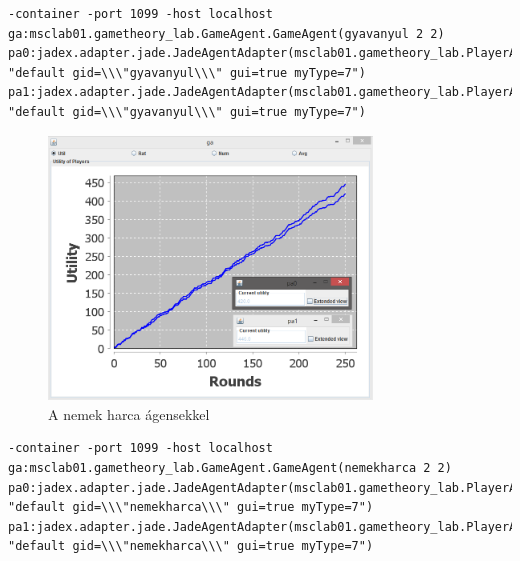 \begin{lstlisting}[caption=Gyáva nyúl run config, frame=single,float=!ht]
-container -port 1099 -host localhost 
ga:msclab01.gametheory_lab.GameAgent.GameAgent(gyavanyul 2 2) 
pa0:jadex.adapter.jade.JadeAgentAdapter(msclab01.gametheory_lab.PlayerAgent.Player 
"default gid=\\\"gyavanyul\\\" gui=true myType=7") 
pa1:jadex.adapter.jade.JadeAgentAdapter(msclab01.gametheory_lab.PlayerAgent.Player 
"default gid=\\\"gyavanyul\\\" gui=true myType=7")
\end{lstlisting}
		

		\begin{figure}[h]
		\begin{center}
		\includegraphics[height=7cm]{figures/nemek_jadex.png}
		\caption{A nemek harca ágensekkel}
		\end{center}
		\end{figure}

\begin{lstlisting}[caption=Nemek harca run config, frame=single,float=!ht]
-container -port 1099 -host localhost 
ga:msclab01.gametheory_lab.GameAgent.GameAgent(nemekharca 2 2) 
pa0:jadex.adapter.jade.JadeAgentAdapter(msclab01.gametheory_lab.PlayerAgent.Player 
"default gid=\\\"nemekharca\\\" gui=true myType=7") 
pa1:jadex.adapter.jade.JadeAgentAdapter(msclab01.gametheory_lab.PlayerAgent.Player 
"default gid=\\\"nemekharca\\\" gui=true myType=7")
\end{lstlisting}
		

